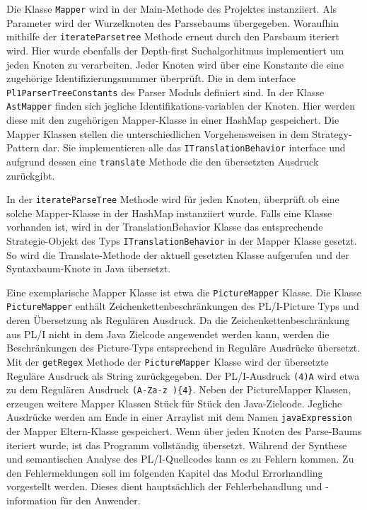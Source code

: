Die Klasse \verb+Mapper+ wird in der Main-Methode des Projektes instanziiert. Als Parameter wird der Wurzelknoten des Parssebaums übergegeben.
Woraufhin mithilfe der \verb+iterateParsetree+ Methode erneut durch den Parsbaum iteriert wird. Hier wurde ebenfalls der Depth-first Suchalgorhitmus implementiert um jeden Knoten zu verarbeiten. Jeder Knoten wird über eine Konstante die eine zugehörige Identifizierungsnummer überprüft. Die in dem interface \verb+Pl1ParserTreeConstants+ des Parser Moduls definiert sind. 
In der Klasse \verb+AstMapper+ finden sich jegliche Identifikations-variablen der Knoten. Hier werden diese mit den zugehörigen Mapper-Klasse in einer HashMap gespeichert.
Die Mapper Klassen stellen die unterschiedlichen Vorgehensweisen in dem Strategy-Pattern dar. Sie implementieren alle das \verb+ITranslationBehavior+ interface und aufgrund dessen eine \verb+translate+ Methode die den übersetzten Ausdruck zurückgibt. 

In der \verb+iterateParseTree+ Methode wird für jeden Knoten, überprüft ob eine solche Mapper-Klasse in der HashMap instanziiert wurde.
Falls eine Klasse vorhanden ist, wird in der TranslationBehavior Klasse das entsprechende Strategie-Objekt des Typs \verb+ITranslationBehavior+ in der
Mapper Klasse gesetzt. So wird die Translate-Methode der aktuell gesetzten Klasse aufgerufen und der Syntaxbaum-Knote in Java übersetzt.

Eine exemplarische Mapper Klasse ist etwa die \verb+PictureMapper+ Klasse.
Die Klasse \verb+PictureMapper+ enthält Zeichenkettenbeschränkungen des PL/I-Picture Typs und deren Übersetzung als Regulären Ausdruck.
Da die Zeichenkettenbeschränkung aus PL/I nicht in dem Java Zielcode angewendet werden kann, werden die Beschränkungen des Picture-Typs entsprechend in Reguläre Ausdrücke übersetzt.
Mit der \verb+getRegex+ Methode der \verb+PictureMapper+ Klasse wird der übersetzte Reguläre Ausdruck als String zurückgegeben.
Der PL/I-Ausdruck \verb+(4)A+ wird etwa zu dem Regulären Ausdruck \verb+(A-Za-z ){4}+.   
Neben der PictureMapper Klassen, erzeugen weitere Mapper Klassen Stück für Stück den Java-Zielcode. 
Jegliche Ausdrücke werden am Ende in einer Arraylist mit dem Namen \verb+javaExpression+ der Mapper Eltern-Klasse  gespeichert.
Wenn über jeden Knoten des Parse-Baums iteriert wurde, ist das Programm vollständig übersetzt.
Während der Synthese und semantischen Analyse des PL/I-Quellcodes kann es zu Fehlern kommen.
Zu den Fehlermeldungen soll im folgenden Kapitel das Modul Errorhandling vorgestellt werden.
Dieses dient hauptsächlich der Fehlerbehandlung und -information für den Anwender.

